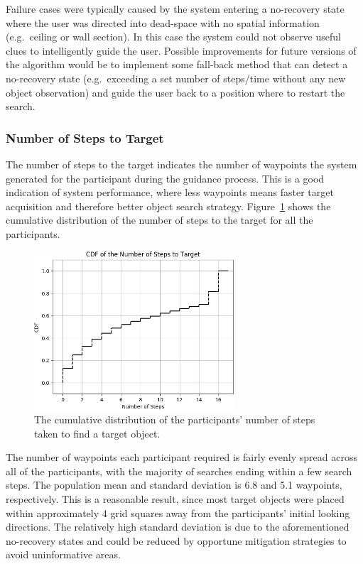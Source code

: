 \documentclass[a4paper, twoside]{article}
\begin{document}
Failure cases were typically caused by the system entering a no-recovery state where the user was directed into dead-space with no spatial information (e.g.\ ceiling or wall section). In this case the system could not observe useful clues to intelligently guide the user. Possible improvements for future versions of the algorithm would be to implement some fall-back method that can detect a no-recovery state (e.g.\ exceeding a set number of steps/time without any new object observation) and guide the user back to a position where to restart the search.

\subsubsection{Number of Steps to Target}

\noindent The number of steps to the target indicates the number of waypoints the system generated for the participant during the guidance process. This is a good indication of system performance, where less waypoints means faster target acquisition and therefore better object search strategy. Figure~\ref{fig:nsteps-participants} shows the cumulative distribution of the number of steps to the target for all the participants. 

\begin{figure}[b]
  \centering
  \includegraphics[height=5.9cm]{figures/cdf_total_steps.png}
  \caption{The cumulative distribution of the participants' number of steps taken to find a target object. }\label{fig:nsteps-participants}
\end{figure}

The number of waypoints each participant required is fairly evenly spread across all of the participants, with the majority of searches ending within a few search steps. The population mean and standard deviation is 6.8 and 5.1 waypoints, respectively. This is a reasonable result, since most target objects were placed within approximately 4 grid squares away from the participants' initial looking directions. The relatively high standard deviation is due to the aforementioned no-recovery states and could be reduced by opportune mitigation strategies to avoid uninformative areas.
\end{document}
